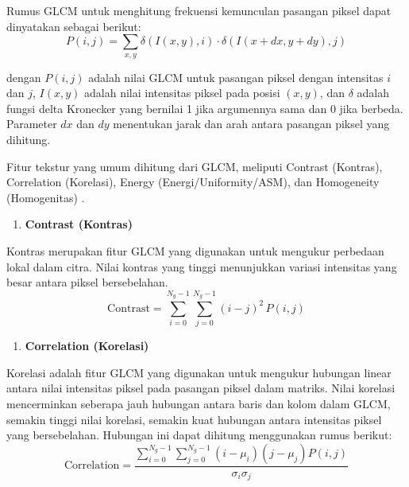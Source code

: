 Rumus GLCM untuk menghitung frekuensi kemunculan pasangan piksel dapat dinyatakan sebagai berikut:
\begin{equation}
	P(i,j) = \sum_{x,y} \delta(I(x,y), i) \cdot \delta(I(x+dx,y+dy), j)
	\label{eq:glcm}
\end{equation}
\noindent

dengan $P(i,j)$ adalah nilai GLCM untuk pasangan piksel dengan intensitas $i$ dan $j$, $I(x,y)$ adalah nilai intensitas piksel pada posisi $(x,y)$, dan $\delta$ adalah fungsi delta Kronecker yang bernilai 1 jika argumennya sama dan 0 jika berbeda. Parameter $dx$ dan $dy$ menentukan jarak dan arah antara pasangan piksel yang dihitung.

Fitur tekstur yang umum dihitung dari GLCM, meliputi Contrast (Kontras), Correlation (Korelasi), Energy (Energi/Uniformity/ASM), dan Homogeneity (Homogenitas) \cite{hanafi2025analisis}.
\begin{enumerate}
	\item \textbf{Contrast (Kontras)} \label{II.Ekstraksi Fitur Tekstur.Kontras}
\end{enumerate}

Kontras merupakan fitur GLCM yang digunakan untuk mengukur perbedaan lokal dalam citra. Nilai kontras yang tinggi menunjukkan variasi intensitas yang besar antara piksel bersebelahan.
\begin{equation}
	\text{Contrast} = \sum_{i=0}^{N_g-1} \sum_{j=0}^{N_g-1} (i-j)^2 \, P(i,j)
	\label{eq:glcm-contrast}
\end{equation}

\begin{enumerate} [resume]
	\item \textbf{Correlation (Korelasi)} \label{II.Ekstraksi Fitur Tekstur.Korelasi}
\end{enumerate}
Korelasi adalah fitur GLCM yang digunakan untuk mengukur hubungan linear antara nilai intensitas piksel pada pasangan piksel dalam matriks. Nilai korelasi mencerminkan seberapa jauh hubungan antara baris dan kolom dalam GLCM, semakin tinggi nilai korelasi, semakin kuat hubungan antara intensitas piksel yang bersebelahan. Hubungan ini dapat dihitung menggunakan rumus berikut:
\begin{equation}
	\text{Correlation} = \frac{\sum_{i=0}^{N_g-1} \sum_{j=0}^{N_g-1} (i-\mu_i)(j-\mu_j) P(i,j)}{\sigma_i \sigma_j}
	\label{eq:glcm-correlation}
\end{equation}


